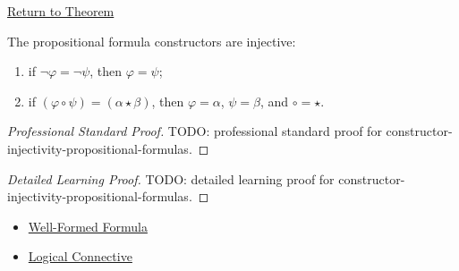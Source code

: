 \newpage
{}
\label{prf:constructor-injectivity-propositional-formulas}

\begin{remark*}[Return]
\hyperref[lem:constructor-injectivity-propositional-formulas]{Return to Theorem}
\end{remark*}

\begin{lemma*}
The propositional formula constructors are injective:
\begin{enumerate}
\item if \(\neg\varphi=\neg\psi\), then \(\varphi=\psi\);
\item if \((\varphi\circ\psi)=(\alpha\star\beta)\), then \(\varphi=\alpha\), \(\psi=\beta\), and \(\circ=\star\).
\end{enumerate}
\end{lemma*}

\begin{proof}[Professional Standard Proof]
\LRAProofBodyStart
TODO: professional standard proof for constructor-injectivity-propositional-formulas.
\end{proof}

\begin{proof}[Detailed Learning Proof]
\LRAProofBodyStart
TODO: detailed learning proof for constructor-injectivity-propositional-formulas.
\end{proof}

\begin{remark*}
\end{remark*}

\begin{dependencies}
\begin{itemize}
  \item \hyperref[def:well-formed-formula]{Well-Formed Formula}
  \item \hyperref[def:logical-connective]{Logical Connective}
\end{itemize}
\end{dependencies}

\clearpage
